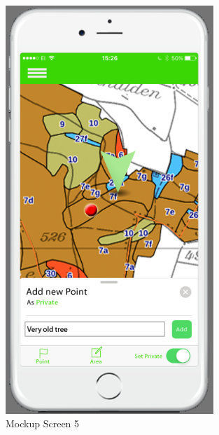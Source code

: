 \begin{figure}[h]
\centering
    \includegraphics[width=0.7\textwidth]{mockup1-5}
    \caption{Mockup Screen 5}
    \label{fig:mesh5}
\end{figure}

